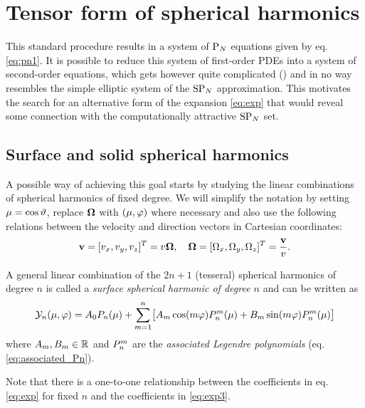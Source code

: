 \section{Tensor form of spherical harmonics}\label{sec:tens_sph}
This standard procedure results in a system of $\PN$ equations given by eq. \eqref{eq:pn1}. It is possible to reduce
this system of first-order PDEs into a system of second-order equations, which gets however quite complicated
(\cite{ModestYang, Capilla}) and in no way resembles the simple elliptic system of the $\SPN$ approximation.
This motivates the search for an alternative form of the expansion \eqref{eq:exp} that would reveal some connection
with the computationally attractive $\SPN$ set.

\subsection{Surface and solid spherical harmonics}
A possible way of achieving this goal starts by studying the linear combinations of spherical harmonics of fixed
degree.
We will simplify the notation by setting $\mu = \cost$, replace $\bomega$ with $(\mu, \azimuthal)$ where necessary and also use the
following relations between the velocity and direction vectors in Cartesian coordinates:
$$
  \bv = [v_x, v_y, v_z]^T = v\bomega,\quad \bomega = [\Omega_x, \Omega_y, \Omega_z]^T = \frac{\bv}{v}.
$$
\begin{definition}\label{defn:SSH}\cite[Def. 3.22]{Schreiner}
  A general linear combination of the $2n + 1$ (tesseral) spherical harmonics of degree $n$ is called a \textit{surface spherical 
  harmonic of degree $n$} and can be written as
  \begin{equation}\label{eq:exp3}
    \mathcal{Y}_n(\mu,\azimuthal) = A_0 P_n(\mu) + \suma[m]{1}{n}\bigl[ A_m \cos(m\azimuthal)\P{n}{m}(\mu) + B_m
    \sin(m\azimuthal)\P{n}{m}(\mu)\bigr]
  \end{equation}
  where $A_m,B_m \in \R$ and  $\P{n}{m}$ are the \textit{associated Legendre polynomials} (eq.
  \eqref{eq:associated_Pn}).
\end{definition}
Note that there is a one-to-one relationship between the coefficients in eq. \eqref{eq:exp} for fixed $n$ and the 
coefficients in \eqref{eq:exp3}.

